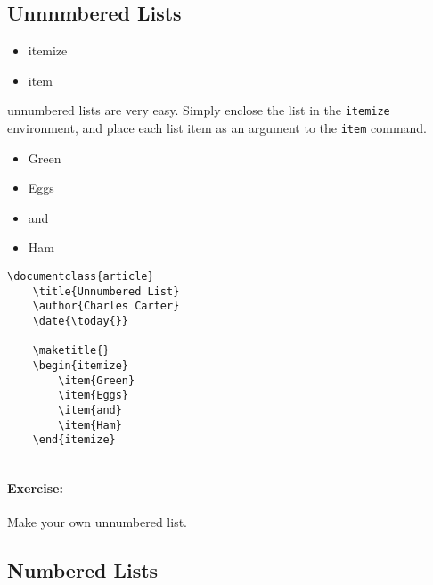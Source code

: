         \subsection{Unnnmbered Lists}
        \label{Unnnumbered Lists}
        
        \begin{framed}
            \begin{itemize}
                \item{itemize}
                \item{item}
            \end{itemize}
        \end{framed}

        \Lx{} unnumbered lists are very easy. Simply enclose the list in the \texttt{itemize} environment, and place each list item as an argument to the \texttt{item} command.

    \begin{itemize}
    \label{lists:itemize}
        \item{Green}
        \item{Eggs}
        \item{and}
        \item{Ham}
    \end{itemize}

        \begin{verbatim}
\documentclass{article}
    \title{Unnumbered List}
    \author{Charles Carter}
    \date{\today{}}
 
    \maketitle{}
    \begin{itemize}
        \item{Green}
        \item{Eggs}
        \item{and}
        \item{Ham}
    \end{itemize}
    
        \end{verbatim}

        \paragraph{Exercise:} Make your own unnumbered list.

        \subsection{Numbered Lists}
        \label{Numbered Lists}
        
